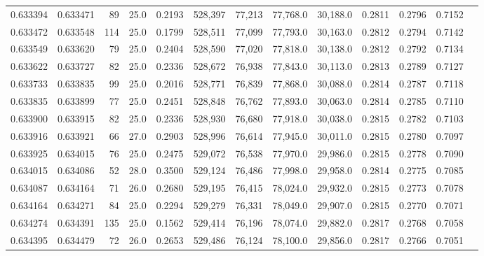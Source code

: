\begin{tabular}{rrrrrrrrrrrrr}
0.633394 & 0.633471 &    89 & 25.0 &                                     0.2193 & 528,397 &  77,213 &  77,768.0 &  30,188.0 & 0.2811 & 0.2796 & 0.7152 \\
0.633472 & 0.633548 &   114 & 25.0 &                                     0.1799 & 528,511 &  77,099 &  77,793.0 &  30,163.0 & 0.2812 & 0.2794 & 0.7142 \\
0.633549 & 0.633620 &    79 & 25.0 &                                     0.2404 & 528,590 &  77,020 &  77,818.0 &  30,138.0 & 0.2812 & 0.2792 & 0.7134 \\
0.633622 & 0.633727 &    82 & 25.0 &                                     0.2336 & 528,672 &  76,938 &  77,843.0 &  30,113.0 & 0.2813 & 0.2789 & 0.7127 \\
0.633733 & 0.633835 &    99 & 25.0 &                                     0.2016 & 528,771 &  76,839 &  77,868.0 &  30,088.0 & 0.2814 & 0.2787 & 0.7118 \\
0.633835 & 0.633899 &    77 & 25.0 &                                     0.2451 & 528,848 &  76,762 &  77,893.0 &  30,063.0 & 0.2814 & 0.2785 & 0.7110 \\
0.633900 & 0.633915 &    82 & 25.0 &                                     0.2336 & 528,930 &  76,680 &  77,918.0 &  30,038.0 & 0.2815 & 0.2782 & 0.7103 \\
0.633916 & 0.633921 &    66 & 27.0 &                                     0.2903 & 528,996 &  76,614 &  77,945.0 &  30,011.0 & 0.2815 & 0.2780 & 0.7097 \\
0.633925 & 0.634015 &    76 & 25.0 &                                     0.2475 & 529,072 &  76,538 &  77,970.0 &  29,986.0 & 0.2815 & 0.2778 & 0.7090 \\
0.634015 & 0.634086 &    52 & 28.0 &                                     0.3500 & 529,124 &  76,486 &  77,998.0 &  29,958.0 & 0.2814 & 0.2775 & 0.7085 \\
0.634087 & 0.634164 &    71 & 26.0 &                                     0.2680 & 529,195 &  76,415 &  78,024.0 &  29,932.0 & 0.2815 & 0.2773 & 0.7078 \\
0.634164 & 0.634271 &    84 & 25.0 &                                     0.2294 & 529,279 &  76,331 &  78,049.0 &  29,907.0 & 0.2815 & 0.2770 & 0.7071 \\
0.634274 & 0.634391 &   135 & 25.0 &                                     0.1562 & 529,414 &  76,196 &  78,074.0 &  29,882.0 & 0.2817 & 0.2768 & 0.7058 \\
0.634395 & 0.634479 &    72 & 26.0 &                                     0.2653 & 529,486 &  76,124 &  78,100.0 &  29,856.0 & 0.2817 & 0.2766 & 0.7051 \\

\end{tabular}
